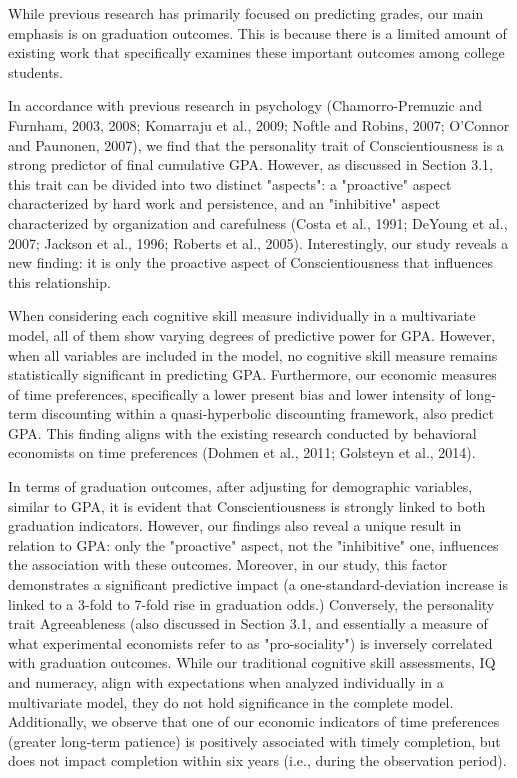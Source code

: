 \documentclass[12pt,a4paper]{article}
\begin{document}
While previous research has primarily focused on predicting grades, our main emphasis is on graduation outcomes. This is because there is a limited amount of existing work that specifically examines these important outcomes among college students.

In accordance with previous research in psychology (Chamorro-Premuzic and Furnham, 2003, 2008; Komarraju et al., 2009; Noftle and Robins, 2007; O'Connor and Paunonen, 2007), we find that the personality trait of Conscientiousness is a strong predictor of final cumulative GPA. However, as discussed in Section 3.1, this trait can be divided into two distinct "aspects": a "proactive" aspect characterized by hard work and persistence, and an "inhibitive" aspect characterized by organization and carefulness (Costa et al., 1991; DeYoung et al., 2007; Jackson et al., 1996; Roberts et al., 2005). Interestingly, our study reveals a new finding: it is only the proactive aspect of Conscientiousness that influences this relationship.

When considering each cognitive skill measure individually in a multivariate model, all of them show varying degrees of predictive power for GPA. However, when all variables are included in the model, no cognitive skill measure remains statistically significant in predicting GPA. Furthermore, our economic measures of time preferences, specifically a lower present bias and lower intensity of long-term discounting within a quasi-hyperbolic discounting framework, also predict GPA. This finding aligns with the existing research conducted by behavioral economists on time preferences (Dohmen et al., 2011; Golsteyn et al., 2014).

In terms of graduation outcomes, after adjusting for demographic variables, similar to GPA, it is evident that Conscientiousness is strongly linked to both graduation indicators. However, our findings also reveal a unique result in relation to GPA: only the "proactive" aspect, not the "inhibitive" one, influences the association with these outcomes. Moreover, in our study, this factor demonstrates a significant predictive impact (a one-standard-deviation increase is linked to a 3-fold to 7-fold rise in graduation odds.) Conversely, the personality trait Agreeableness (also discussed in Section 3.1, and essentially a measure of what experimental economists refer to as "pro-sociality") is inversely correlated with graduation outcomes. While our traditional cognitive skill assessments, IQ and numeracy, align with expectations when analyzed individually in a multivariate model, they do not hold significance in the complete model. Additionally, we observe that one of our economic indicators of time preferences (greater long-term patience) is positively associated with timely completion, but does not impact completion within six years (i.e., during the observation period).
\end{document}
